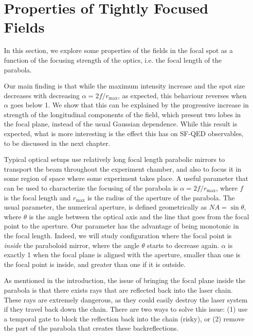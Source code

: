 \documentclass[11pt,SymmetricalJury]{inrsthesis/inrsthesis}
\begin{document}
\section{Properties of Tightly Focused Fields}

In this section, we explore some properties of the fields in the focal
spot as a function of the focusing strength of the optics, i.e. the
focal length of the parabola.

Our main finding is that while the maximum intensity increase and the spot
size decreases with decreasing $\alpha=2f/r_\text{max}$, as expected, this behaviour
reverses when $\alpha$ goes below 1. We show that this can be explained by the
progressive increase in strength of the longitudinal components of the field, which
present two lobes in the focal plane, instead of the usual Gaussian dependence.
While this result is expected, what is more interesting is the effect this has
on SF-QED observables, to be discussed in the next chapter.

Typical optical setups use relatively long focal length parabolic mirrors
to transport the beam throughout the experiment chamber, and also
to focus it in some region of space where some experiment takes place.
A useful parameter that can be used to characterize the focusing of the parabola
is $\alpha=2f/r_\text{max}$, where $f$ is the focal length and $r_\text{max}$
is the radius of the aperture of the parabola. The usual parameter, the numerical
aperture, is defined geometrically as $NA=\sin\theta$, where $\theta$ is the
angle between the optical axis and the line that goes from the focal point
to the aperture. Our parameter has the advantage of being monotonic
in the focal length. Indeed, we will study configuration where the focal
point is \textit{inside} the paraboloid mirror, where the angle $\theta$
starts to decrease again. $\alpha$ is exactly 1 when the focal plane is aligned
with the aperture, smaller than one is the focal point is inside, and greater
than one if it is outside.

As mentioned in the introduction, the issue of bringing the focal plane
inside the parabola is that there exists rays that are reflected back into
the laser chain. These rays are extremely dangerous, as they could easily
destroy the laser system if they travel back down the chain. There are two
ways to solve this issue: (1) use a temporal gate to block the reflection
back into the chain (risky), or (2) remove the part of the parabola that
creates these backreflections.
\end{document}
